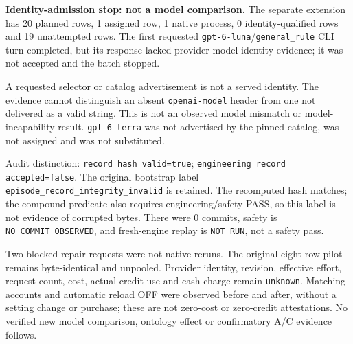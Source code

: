 \textbf{Identity-admission stop: not a model comparison.} The separate extension has 20 planned rows, 1 assigned row, 1 native process, 0 identity-qualified rows and 19 unattempted rows. The first requested \texttt{gpt-6-luna}/\texttt{general\_rule} CLI turn completed, but its response lacked provider model-identity evidence; it was not accepted and the batch stopped.

A requested selector or catalog advertisement is not a served identity. The evidence cannot distinguish an absent \texttt{openai-model} header from one not delivered as a valid string. This is not an observed model mismatch or model-incapability result. \texttt{gpt-6-terra} was not advertised by the pinned catalog, was not assigned and was not substituted.

Audit distinction: \texttt{record hash valid=true}; \texttt{engineering record accepted=false}. The original bootstrap label \texttt{episode\_record\_integrity\_invalid} is retained. The recomputed hash matches; the compound predicate also requires engineering/safety PASS, so this label is not evidence of corrupted bytes. There were 0 commits, safety is \texttt{NO\_COMMIT\_OBSERVED}, and fresh-engine replay is \texttt{NOT\_RUN}, not a safety pass.

Two blocked repair requests were not native reruns. The original eight-row pilot remains byte-identical and unpooled. Provider identity, revision, effective effort, request count, cost, actual credit use and cash charge remain \texttt{unknown}. Matching accounts and automatic reload OFF were observed before and after, without a setting change or purchase; these are not zero-cost or zero-credit attestations. No verified new model comparison, ontology effect or confirmatory A/C evidence follows.

